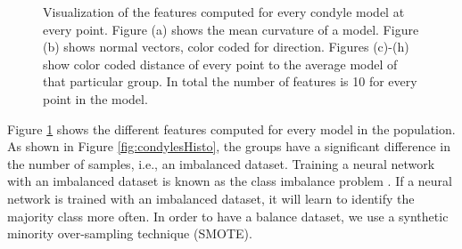 \documentclass[]{spie}  %
\begin{document}
\begin{figure}[t]
    \caption{Visualization of the features computed for every condyle model at every point. Figure (a) shows the mean curvature of a model. Figure (b) shows normal vectors, color coded for direction. Figures (c)-(h) show color coded distance of every point to the average model of that particular group. In total the number of features is 10 for every point in the model.}
    \label{fig:svafeatures}
\end{figure} 
Figure \ref{fig:svafeatures} shows the different features computed for every model in the population.
As shown in Figure \ref{fig:condylesHisto}, the groups have a significant difference in the number of samples, i.e., 
an imbalanced dataset.
Training a neural network with an imbalanced dataset is known as the class imbalance problem \cite{japkowicz2002class}.
If a neural network is trained with an imbalanced dataset, it will learn to identify the majority class
more often. In order to have a balance dataset, we use a synthetic minority over-sampling technique (SMOTE)\cite{chawla2002smote}.
\end{document}
